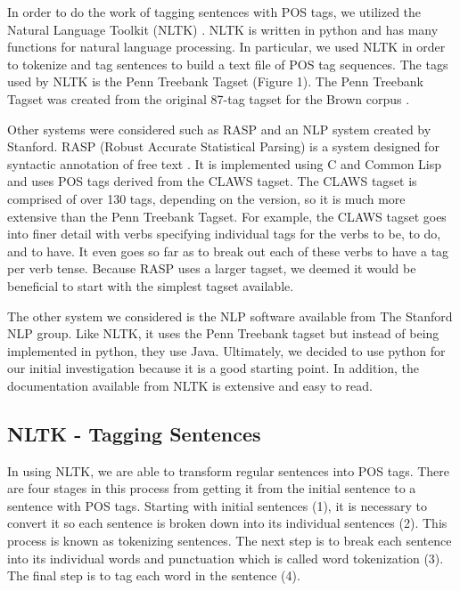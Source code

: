 \documentclass[11pt,a4paper]{article}
\begin{document}
\begin{multicols}{2}
In order to do the work of tagging sentences with POS tags, we utilized the Natural Language Toolkit (NLTK) \cite{nltk}. NLTK is written in python and has many functions for natural language processing. In particular, we used NLTK in order to tokenize and tag sentences to build a text file of POS tag sequences. The tags used by NLTK is the Penn Treebank Tagset (Figure 1). The Penn Treebank Tagset was created from the original 87-tag tagset for the Brown corpus \cite{jurafsky}.

Other systems were considered such as RASP and an NLP system created by Stanford. RASP (Robust Accurate Statistical Parsing) is a system designed for syntactic annotation of free text \cite{briscoe}. It is implemented using C and Common Lisp and uses POS tags derived from the CLAWS tagset. The CLAWS tagset is comprised of over 130 tags, depending on the version, so it is much more extensive than the Penn Treebank Tagset. For example, the CLAWS tagset goes into finer detail with verbs specifying individual tags for the verbs to be, to do, and to have. It even goes so far as to break out each of these verbs to have a tag per verb tense. Because RASP uses a larger tagset, we deemed it would be beneficial to start with the simplest tagset available.  

The other system we considered is the NLP software available from The Stanford NLP group. Like NLTK, it uses the Penn Treebank tagset but instead of being implemented in python, they use Java. Ultimately, we decided to use python for our initial investigation because it is a good starting point. In addition, the documentation available from NLTK is extensive and easy to read.

\subsection{NLTK - Tagging Sentences}
In using NLTK, we are able to transform regular sentences into POS tags. There are four stages in this process from getting it from the initial sentence to a sentence with POS tags. Starting with initial sentences (1), it is necessary to convert it so each sentence is broken down into its individual sentences (2). This process is known as tokenizing sentences. The next step is to break each sentence into its individual words and punctuation which is called word tokenization (3). The final step is to tag each word in the sentence (4).


\end{multicols}
\end{document}

